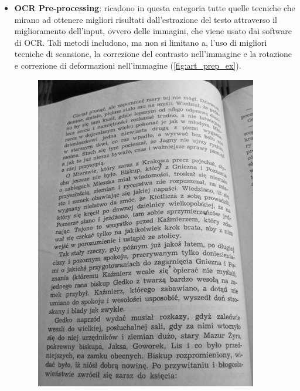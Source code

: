 \begin{itemize}
\item \textbf{OCR Pre-processing}: ricadono in questa categoria tutte quelle tecniche che mirano ad ottenere migliori risultati dall'estrazione del testo attraverso il miglioramento dell'input, ovvero delle immagini, che viene usato dai software di OCR. Tali metodi includono, ma non si limitano a, l'uso di migliori tecniche di scansione, la correzione del contrasto nell'immagine\cite{holley2009good} e la rotazione e correzione di deformazioni nell'immagine\cite{bieniecki2007image} (\autoref{fig:art_prep_ex}).
\begin{figure}[H]
\centering
{
\begin{minipage}{0.35\textwidth}
\includegraphics[width=\textwidth]{immagini/stato_arte/prep1}
\end{minipage} 
\begin{minipage}{0.06\textwidth}

\end{minipage}}
\end{figure}
\end{itemize}
